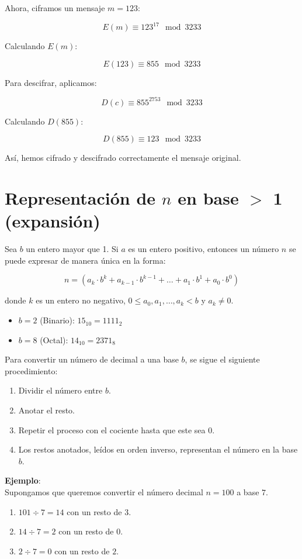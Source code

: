 \documentclass{article}
\begin{document}
Ahora, ciframos un mensaje $ m = 123 $:

$$E(m) \equiv 123^{17} \mod 3233$$

Calculando $ E(m) $:

$$E(123) \equiv 855 \mod 3233$$

Para descifrar, aplicamos:

$$D(c) \equiv 855^{2753} \mod 3233$$

Calculando $ D(855) $:

$$D(855) \equiv 123 \mod 3233$$

Así, hemos cifrado y descifrado correctamente el mensaje original.

\section{Representación de $n$ en base $>$ 1 (expansión)}

Sea $ b $ un entero mayor que 1. Si $ a $ es un entero positivo, entonces un número $ n $ se puede expresar de manera única en la forma:

$$n = (a_k \cdot b^k + a_{k-1} \cdot b^{k-1} + \ldots + a_1 \cdot b^1 + a_0 \cdot b^0)$$

donde $ k $ es un entero no negativo, $ 0 \leq a_0, a_1, \ldots, a_k < b $ y $ a_k \neq 0 $.


\begin{itemize}
    \item $ b = 2 $ (Binario): $15_{10} = 1111_2$
    \item $ b = 8 $ (Octal): $14_{10} =  2371_8$
\end{itemize}


Para convertir un número de decimal a una base $ b $, se sigue el siguiente procedimiento: 
\begin{enumerate}
    \item Dividir el número entre $ b $.
    \item Anotar el resto.
    \item Repetir el proceso con el cociente hasta que este sea 0.
    \item Los restos anotados, leídos en orden inverso, representan el número en la base $ b $.
\end{enumerate}

\textbf{Ejemplo}: \\
Supongamos que queremos convertir el número decimal $ n = 100 $ a base $ 7 $.

\begin{enumerate}
    \item $ 101 \div 7 = 14 $ con un resto de $ 3 $.
    \item $ 14 \div 7 = 2 $ con un resto de $ 0 $.
    \item $ 2 \div 7 = 0 $ con un resto de $ 2 $.
\end{enumerate}
\end{document}
